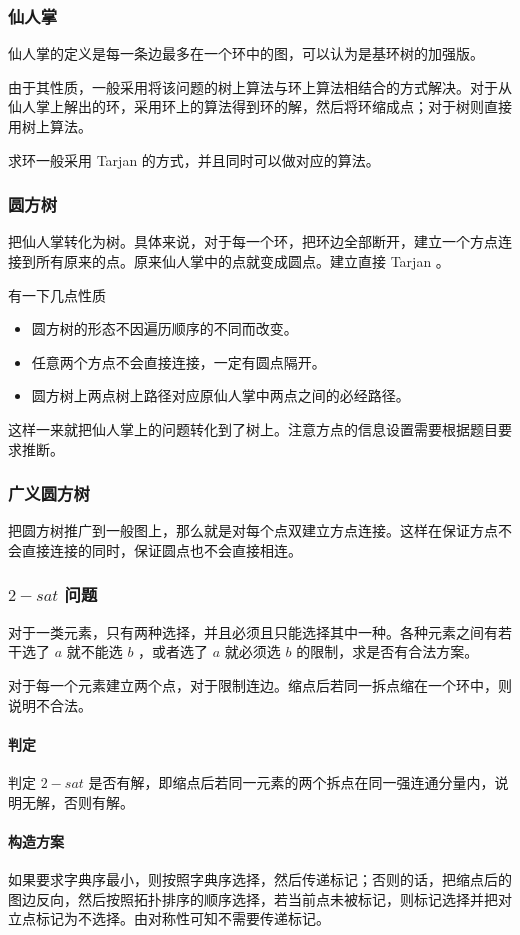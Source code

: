 \documentclass[UTF-8]{ctexart}
\begin{document}
				\subsubsection{仙人掌}
				仙人掌的定义是每一条边最多在一个环中的图，可以认为是基环树的加强版。
				
				由于其性质，一般采用将该问题的树上算法与环上算法相结合的方式解决。对于从仙人掌上解出的环，采用环上的算法得到环的解，然后将环缩成点；对于树则直接用树上算法。
				
				求环一般采用 Tarjan 的方式，并且同时可以做对应的算法。
				\subsubsection{圆方树}
				把仙人掌转化为树。具体来说，对于每一个环，把环边全部断开，建立一个方点连接到所有原来的点。原来仙人掌中的点就变成圆点。建立直接 Tarjan 。
				
				有一下几点性质
				\begin{itemize}
					\item 圆方树的形态不因遍历顺序的不同而改变。
					\item 任意两个方点不会直接连接，一定有圆点隔开。
					\item 圆方树上两点树上路径对应原仙人掌中两点之间的必经路径。
				\end{itemize}
				这样一来就把仙人掌上的问题转化到了树上。注意方点的信息设置需要根据题目要求推断。
				\subsubsection{广义圆方树}
				把圆方树推广到一般图上，那么就是对每个点双建立方点连接。这样在保证方点不会直接连接的同时，保证圆点也不会直接相连。
				\subsubsection{$2-sat$ 问题}
				对于一类元素，只有两种选择，并且必须且只能选择其中一种。各种元素之间有若干选了 $a$ 就不能选 $b$ ，或者选了 $a$ 就必须选 $b$ 的限制，求是否有合法方案。
				
				对于每一个元素建立两个点，对于限制连边。缩点后若同一拆点缩在一个环中，则说明不合法。
				\paragraph{判定}判定 $2-sat$ 是否有解，即缩点后若同一元素的两个拆点在同一强连通分量内，说明无解，否则有解。
				\paragraph{构造方案} 如果要求字典序最小，则按照字典序选择，然后传递标记；否则的话，把缩点后的图边反向，然后按照拓扑排序的顺序选择，若当前点未被标记，则标记选择并把对立点标记为不选择。由对称性可知不需要传递标记。
\end{document}
